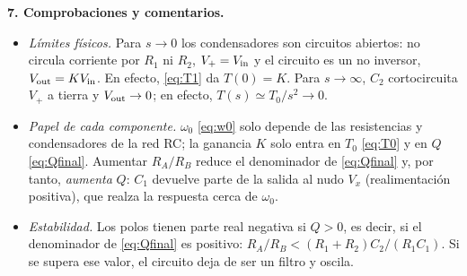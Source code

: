 \begin{resolucion}
\textbf{7. Comprobaciones y comentarios.}
\begin{itemize}
  \item \emph{Límites físicos.} Para $s\to0$ los condensadores son circuitos abiertos: no circula corriente por
        $R_1$ ni $R_2$, $V_+=V_{\mathrm{in}}$ y el circuito es un no inversor, $V_{\mathrm{out}}=KV_{\mathrm{in}}$. En efecto, \eqref{eq:T1} da
        $T(0)=K$. Para $s\to\infty$, $C_2$ cortocircuita $V_+$ a tierra y $V_{\mathrm{out}}\to0$; en efecto,
        $T(s)\simeq T_0/s^{2}\to0$.
  \item \emph{Papel de cada componente.} $\omega_0$ \eqref{eq:w0} solo depende de las resistencias y
        condensadores de la red RC; la ganancia $K$ solo entra en $T_0$ \eqref{eq:T0} y en $Q$ \eqref{eq:Qfinal}.
        Aumentar $R_A/R_B$ reduce el denominador de \eqref{eq:Qfinal} y, por tanto, \emph{aumenta} $Q$: $C_1$
        devuelve parte de la salida al nudo $V_x$ (realimentación positiva), que realza la respuesta cerca de
        $\omega_0$.
  \item \emph{Estabilidad.} Los polos tienen parte real negativa si $Q>0$, es decir, si el denominador de
        \eqref{eq:Qfinal} es positivo: $R_A/R_B<(R_1+R_2)C_2/(R_1C_1)$. Si se supera ese valor, el circuito
        deja de ser un filtro y oscila.
\end{itemize}
\end{resolucion}
